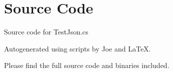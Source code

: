 \documentclass[12pt]{article}
\begin{document}
\maketitle
\pagebreak


\section{Source Code}

Source code for \textsf{TestJson.cs}


\newpage



\newpage

Autogenerated using scripts by Joe and \LaTeX.

Please find the full source code and binaries included.
\end{document}
